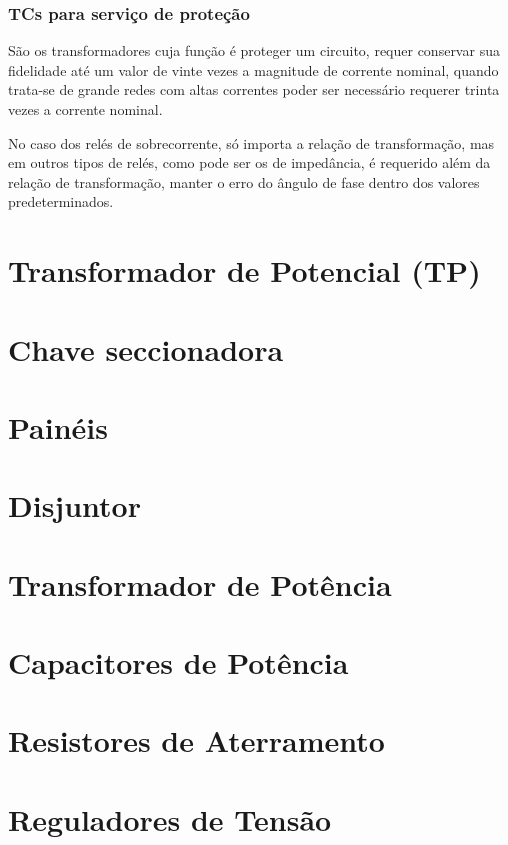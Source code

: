 \documentclass[a5paper,english,spanish,brazil]{ufsc-thesis}
\begin{document}
			\subsubsection{TCs para serviço de proteção}
				São os transformadores cuja função é proteger um circuito, requer conservar sua fidelidade até um valor de vinte vezes a magnitude de corrente nominal, quando trata-se de grande redes com altas correntes poder ser necessário requerer trinta vezes a corrente nominal.\par
				No caso dos relés de sobrecorrente, só importa a relação de transformação, mas em outros tipos de relés, como pode ser os de impedância, é requerido além da relação de transformação, manter o erro do ângulo de fase dentro dos valores predeterminados.\cite{apuntesmeza}\par

	\section{Transformador de Potencial (TP)}

	\section{Chave seccionadora}

	\section{Painéis}

	\section{Disjuntor}

	\section{Transformador de Potência}

	\section{Capacitores de Potência}

	\section{Resistores de Aterramento}

	\section{Reguladores de Tensão}
\end{document}
